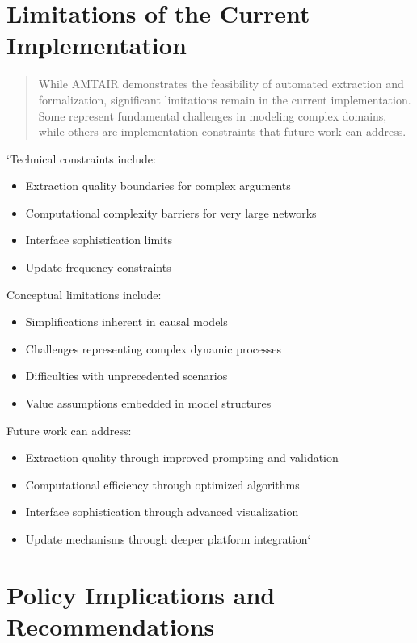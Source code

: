 \documentclass[]{book}
\providecommand{\tightlist}{%
  \setlength{\itemsep}{0pt}\setlength{\parskip}{0pt}}
\begin{document}
\section{Limitations of the Current
Implementation}\label{sec-limitations}

\begin{quote}
While AMTAIR demonstrates the feasibility of automated extraction and
formalization, significant limitations remain in the current
implementation. Some represent fundamental challenges in modeling
complex domains, while others are implementation constraints that future
work can address.
\end{quote}

`Technical constraints include:

\begin{itemize}
\tightlist
\item
  Extraction quality boundaries for complex arguments
\item
  Computational complexity barriers for very large networks
\item
  Interface sophistication limits
\item
  Update frequency constraints
\end{itemize}

Conceptual limitations include:

\begin{itemize}
\tightlist
\item
  Simplifications inherent in causal models
\item
  Challenges representing complex dynamic processes
\item
  Difficulties with unprecedented scenarios
\item
  Value assumptions embedded in model structures
\end{itemize}

Future work can address:

\begin{itemize}
\tightlist
\item
  Extraction quality through improved prompting and validation
\item
  Computational efficiency through optimized algorithms
\item
  Interface sophistication through advanced visualization
\item
  Update mechanisms through deeper platform integration`
\end{itemize}

\section{Policy Implications and
Recommendations}\label{sec-policy-implications}
\end{document}
